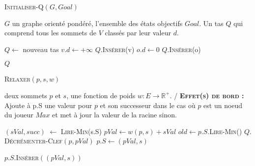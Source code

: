 

\begin{algorithm}
	\caption{\textsc {Initialiser-Q}$(G,Goal)$}
	 \label{algo:initQ}
	\begin{algorithmic}[1]
		\REQUIRE $G$ un graphe orienté pondéré, l'ensemble des états objectifs $Goal$.
		\ENSURE Un tas $Q$ qui comprend tous les sommets de $V$ classés par leur valeur $d$.
		
		\STATE $Q \leftarrow$ nouveau tas 
			\STATE $v.d \leftarrow +\infty$
			\STATE $Q.$\textsc{Insérer}(v)
		\ENDFOR
			\STATE $o.d \leftarrow 0$
			\STATE $Q.$\textsc{Insérer}(o)	
		\ENDFOR
		
		\RETURN $Q$
	
			
\end{algorithmic}
		
\end{algorithm}


\begin{algorithm}
	\caption{\textsc {Relaxer}$(p,s,w)$}
	 \label{algo:relaxerMinMax}
	\begin{algorithmic}[1]
		\REQUIRE deux sommets $p$ et $s$, une fonction de poids $w : E \rightarrow \mathbb{R}^{+}$.
		\ENSURE / \textbf{\textsc{Effet(s) de bord :}} Ajoute à p.S une valeur pour $p$ et son successeur dans le cas où
		$p$ est un noeud du joueur $\textit{Max}$ et met à jour la valeur de la racine sinon.
		
		\STATE $(sVal,succ)$ $\leftarrow$ \textsc{Lire-Min}(s.S) \label{lalgo:relaxer1}
		\STATE $pVal \leftarrow w(p,s) + sVal$	
		\STATE $old \leftarrow p.S.$\textsc{Lire-Min()} \label{lalgo:relaxer4}
		 \label{lalgo:relaxer5}
			\STATE $Q.$\textsc{Décrémenter-Clef}$(p,pVal)$ 
				\STATE $p.S \leftarrow (pVal,s)$
			\ENDIF 
		\ENDIF \label{lalgo:relaxer10}
		
		 \label{lalgo:relaxer11}
			\STATE $p.S.$\textsc{Insérer}$((pVal,s))$ 
		\ENDIF \label{lalgo:relaxer12}
			
\end{algorithmic}
		
\end{algorithm}


